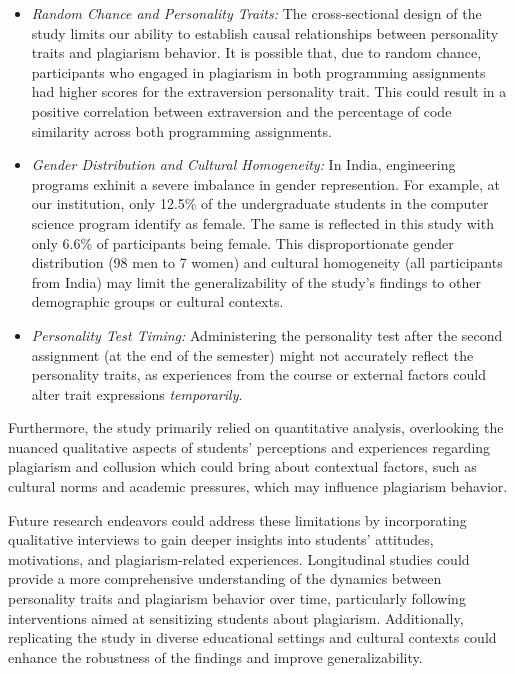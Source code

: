 \begin{itemize}
    \item \textit{Random Chance and Personality Traits:} The cross-sectional design of the study limits our ability to establish causal relationships between personality traits and plagiarism behavior. It is possible that, due to random chance, participants who engaged in plagiarism in both programming assignments had higher scores for the extraversion personality trait. This could result in a positive correlation between extraversion and the percentage of code similarity across both programming assignments.
    \item \textit{Gender Distribution and Cultural Homogeneity:} In India, engineering programs exhinit a severe imbalance in gender represention. For example, at our institution, only 12.5\% of the undergraduate students in the computer science program identify as female. The same is reflected in this study with only 6.6\% of participants being female. This disproportionate gender distribution (98 men to 7 women) and cultural homogeneity (all participants from India) may limit the generalizability of the study's findings to other demographic groups or cultural contexts.  
    \item \textit{Personality Test Timing:} Administering the personality test after the second assignment (at the end of the semester) might not accurately reflect the personality traits, as experiences from the course or external factors could alter trait expressions \emph{temporarily}.
\end{itemize}

Furthermore, the study primarily relied on quantitative analysis, overlooking the nuanced qualitative aspects of students' perceptions and experiences regarding plagiarism and collusion which could bring about contextual factors, such as cultural norms and academic pressures, which may influence plagiarism behavior.

Future research endeavors could address these limitations by incorporating qualitative interviews to gain deeper insights into students' attitudes, motivations, and plagiarism-related experiences. Longitudinal studies could provide a more comprehensive understanding of the dynamics between personality traits and plagiarism behavior over time, particularly following interventions aimed at sensitizing students about plagiarism. Additionally, replicating the study in diverse educational settings and cultural contexts could enhance the robustness of the findings and improve generalizability.
 
